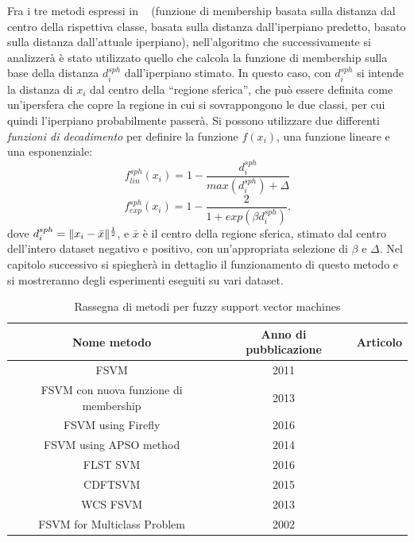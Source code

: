 \documentclass[oneside, openany]{book}
\DeclarePairedDelimiter{\norma}{\lVert}{\rVert}
\begin{document}
	Fra i tre metodi espressi in ~\cite{bib:cil} (funzione di membership basata sulla distanza dal centro della rispettiva classe, basata sulla distanza dall'iperpiano predetto, basato sulla distanza dall'attuale iperpiano), nell'algoritmo che successivamente si analizzerà è stato utilizzato quello che calcola la funzione di membership sulla base della distanza $d_i^{sph}$ dall'iperpiano stimato. In questo caso, con $d_i^{sph}$ si intende la distanza di $x_i$ dal centro della ``regione sferica'', che può essere definita come un'ipersfera che copre la regione in cui si sovrappongono le due classi, per cui quindi l'iperpiano probabilmente passerà. Si possono utilizzare due differenti \textit{funzioni di decadimento} per definire la funzione $f(x_i)$, una funzione lineare e una esponenziale:
	\[
		f_{lin}	^{sph}(x_i) = 1 - \frac{d_i^{sph}}{max(d_i^{sph})+\Delta} 
	\]
	\[
		f_{exp}	^{sph}(x_i) = 1 - \frac{2}{1+exp(\beta d_i^{sph})}\text{,}
	\]
	dove $d_i^{sph}=\norma{x_i-\bar{x}}^{\frac{1}{2}}$, e $\bar{x}$ è il centro della regione sferica, stimato dal centro dell'intero dataset negativo e positivo, con un'appropriata selezione di $\beta$ e $\Delta$. Nel capitolo successivo si spiegherà in dettaglio il funzionamento di questo metodo e si mostreranno degli esperimenti eseguiti su vari dataset.	
		
		\begin{table}[h!]
		\caption{Rassegna di metodi per fuzzy support vector machines}
		\begin{center}\begin{tabular}{ |c|c|c| } 
				\hline
				Nome metodo & Anno di pubblicazione & Articolo\\
				\hline
				FSVM & 2011 & \cite{bib:fsvm}\\
				\hline
				FSVM con nuova funzione di membership & 2013 & \cite{bib:fsvm2}\\ 
				\hline
				FSVM using Firefly & 2016 & \cite{bib:firefly}\\
				\hline
				FSVM using APSO method & 2014 & \cite{bib:apso} \\
				\hline
				FLST SVM & 2016 & \cite{bib:flst} \\
				\hline
				CDFTSVM & 2015 & \cite{bib:cdt}\\
				\hline	
				WCS FSVM & 2013 & \cite{bib:wcs}\\
				\hline	
				FSVM for Multiclass Problem & 2002 & \cite{bib:multi} \\
				\hline										
			\end{tabular}
		\end{center}
		\label{tab:svm}	
	\end{table}
\end{document}
